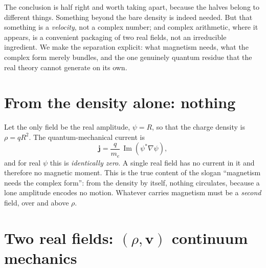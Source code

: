 \documentclass[11pt]{article}
\begin{document}
The conclusion is half right and worth taking apart, because the halves belong to different things. Something
beyond the bare density is indeed needed. But that something is a \emph{velocity}, not a complex number; and
complex arithmetic, where it appears, is a convenient packaging of two real fields, not an irreducible
ingredient. We make the separation explicit: what magnetism needs, what the complex form merely bundles, and
the one genuinely quantum residue that the real theory cannot generate on its own.

\section{From the density alone: nothing}

Let the only field be the real amplitude, $\psi=R$, so that the charge density is $\rho=q R^2$. The
quantum-mechanical current is
\[
\mathbf j=\frac{q}{m_e}\,\operatorname{Im}(\psi^*\nabla\psi),
\]
and for real $\psi$ this is \emph{identically zero}. A single real field has no current in it and therefore no
magnetic moment. This is the true content of the slogan ``magnetism needs the complex form'': from the density
by itself, nothing circulates, because a lone amplitude encodes no motion. Whatever carries magnetism must be a
\emph{second} field, over and above $\rho$.

\section{Two real fields: $(\rho,\mathbf v)$ continuum mechanics}
\end{document}
